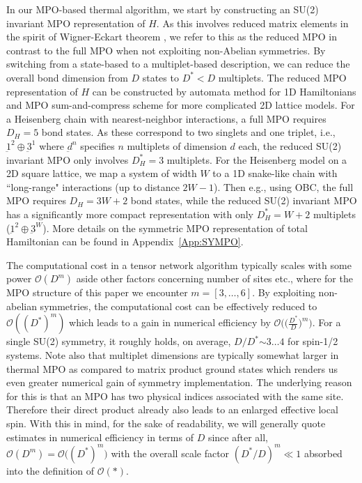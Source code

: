 \documentclass[aps,prx,twocolumn,showpacs,psfig,superscriptaddress,longbibliography]{revtex4-1}
\newcommand{\order}[1]{\mathcal{O}{\left(#1\right)}}
\newcommand{\orderb}[1]{\mathcal{O}{\bigl(#1\bigr)}}
\newcommand{\App}[1]{Appendix~\ref{#1}}
\def\Dstar{D^\ast}
\begin{document}
In our MPO-based thermal algorithm, we start by constructing an
SU(2) invariant MPO representation of $H$.  As this involves reduced
matrix elements in the spirit of Wigner-Eckart theorem
\cite{Weichselbaum.a:2012:QSpace}, we refer to this as the reduced
MPO in contrast to the full MPO  {when not exploiting non-Abelian 
symmetries}.  By switching from a state-based to a
multiplet-based description, we can reduce the overall bond
dimension from $D$ states to $\Dstar <D$ multiplets.
%
The reduced MPO representation of $H$ can be constructed by automata
method \cite{Crosswhite.g.m+:2008:Automata, Frowis.f+:2010:Tensor,
Pirvu.b+:2010:MPO} for 1D Hamiltonians and MPO sum-and-compress
scheme \cite{Hubig.c+:2017:MPO} for more complicated 2D lattice
models. For a Heisenberg chain with nearest-neighbor interactions, a
full MPO requires $D_H=5$ bond states. As  {these correspond} to two
singlets and one triplet, i.e., $\underbar{1}^2 \oplus
\underbar{3}^1$ where $\underbar{d}^n$ specifies $n$ multiplets of
dimension $d$ each, the reduced SU(2) invariant MPO only involves
$\Dstar _H=3$ multiplets.  For the Heisenberg model on a 2D square
lattice, we map a system of width $W$ to a 1D snake-like chain with
``long-range" interactions (up to distance $2W-1$).  Then e.g.,
using OBC, the full MPO requires $D_H = 3 W + 2$ bond states, while
the reduced SU(2) invariant MPO has a significantly more compact
representation with only $\Dstar_H = W + 2$ multiplets
($\underbar{1}^2 \oplus \underbar{3}^{W}$).  More details on the
symmetric MPO representation of total Hamiltonian can be found in
\App{App:SYMPO}.

The computational cost in a tensor network algorithm typically
scales with some power $\order{D^m}$ aside other factors concerning
number of sites etc., where for the MPO structure of this paper we
encounter $m=[3,\ldots,6]$.  By exploiting non-abelian symmetries,
the computational cost can be effectively reduced to
$\order{(\Dstar)^m}$ which leads to a gain in numerical efficiency
by $\orderb{\bigr( \tfrac{\Dstar}{D}\bigl)^m}$.  For a single SU(2)
symmetry, it roughly holds, on average, $D/\Dstar  {\sim 3\ldots4}$ for
spin-1/2 systems. Note also that multiplet dimensions are typically
somewhat larger in thermal MPO as compared to matrix product ground
states which renders us even greater numerical gain of symmetry
implementation.  The underlying reason for this is that an MPO has
two physical indices associated with the same site. Therefore their
direct product already also leads to an enlarged effective local
spin.  With this in mind, for the sake of readability, we will
generally quote estimates in numerical efficiency in terms of $D$
since after all,  $\order{D^m} = \orderb{(\Dstar)^m}$ with the
overall scale factor $(\Dstar/D)^m \ll 1$ absorbed into the
definition of $\order{\ast}$.
\end{document}
